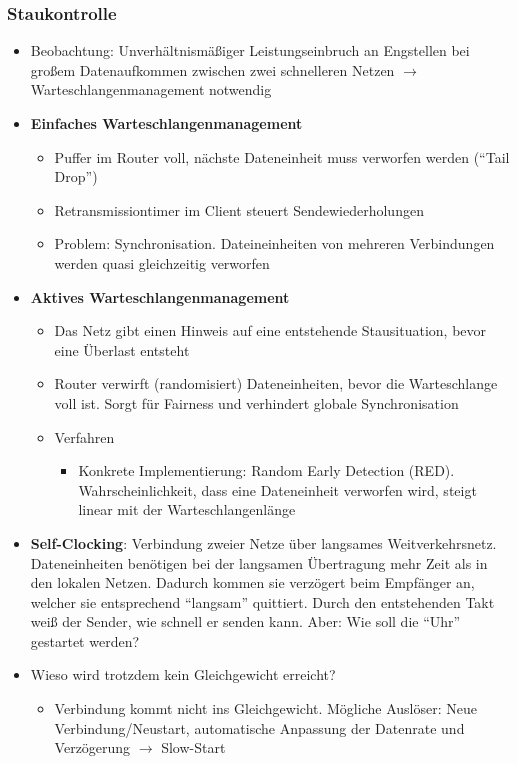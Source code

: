 \subsubsection{Staukontrolle}
\begin{itemize}
	\item Beobachtung: Unverhältnismäßiger Leistungseinbruch an Engstellen bei großem Datenaufkommen zwischen zwei schnelleren Netzen \(\rightarrow\) Warteschlangenmanagement notwendig
	\item \textbf{Einfaches Warteschlangenmanagement}
	\begin{itemize}
		\item Puffer im Router voll, nächste Dateneinheit muss verworfen werden ("`Tail Drop"')
		\item Retransmissiontimer im Client steuert Sendewiederholungen
		\item Problem: Synchronisation. Dateineinheiten von mehreren Verbindungen werden quasi gleichzeitig verworfen
	\end{itemize}
	\item \textbf{Aktives Warteschlangenmanagement}
	\begin{itemize}
		\item Das Netz gibt einen Hinweis auf eine entstehende Stausituation, bevor eine Überlast entsteht
		\item Router verwirft (randomisiert) Dateneinheiten, bevor die Warteschlange voll ist. Sorgt für Fairness und verhindert globale Synchronisation
		\item Verfahren
		\begin{itemize}
			\item Konkrete Implementierung: Random Early Detection (RED). Wahrscheinlichkeit, dass eine Dateneinheit verworfen wird, steigt linear mit der Warteschlangenlänge
		\end{itemize}
	\end{itemize}
	\item \textbf{Self-Clocking}: Verbindung zweier Netze über langsames Weitverkehrsnetz. Dateneinheiten benötigen bei der langsamen Übertragung mehr Zeit als in den lokalen Netzen. Dadurch kommen sie verzögert beim Empfänger an, welcher sie entsprechend "`langsam"' quittiert. Durch den entstehenden Takt weiß der Sender, wie schnell er senden kann. Aber: Wie soll die "`Uhr"' gestartet werden?
	\item Wieso wird trotzdem kein Gleichgewicht erreicht?
	\begin{itemize}
		\item Verbindung kommt nicht ins Gleichgewicht. Mögliche Auslöser: Neue Verbindung/Neustart, automatische Anpassung der Datenrate und Verzögerung \(\rightarrow\) Slow-Start

\end{itemize}
\end{itemize}
